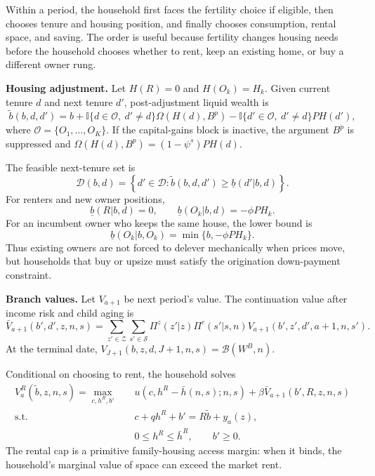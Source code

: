 \documentclass[11pt]{article}
\newcommand{\ind}{\mathbb{I}}
\newcommand{\Dset}{\mathcal D}
\newcommand{\Zset}{\mathcal Z}
\newcommand{\Sset}{\mathcal S}
\newcommand{\Oset}{\mathcal O}
\newcommand{\Bcal}{\mathcal B}
\begin{document}
Within a period, the household first faces the fertility choice if eligible,
then chooses tenure and housing position, and finally chooses consumption,
rental space, and saving. The order is useful because fertility changes
housing needs before the household chooses whether to rent, keep an existing
home, or buy a different owner rung.

\textbf{Housing adjustment.}
Let $H(R)=0$ and $H(O_k)=H_k$. Given current tenure $d$ and next tenure $d'$,
post-adjustment liquid wealth is
\begin{equation}
\widetilde b(b,d,d')
=
b
+\ind\{d\in\Oset,\ d'\neq d\}\Omega(H(d),B^p)
-\ind\{d'\in\Oset,\ d'\neq d\}PH(d'),
\label{eq:adjusted_wealth}
\end{equation}
where $\Oset=\{O_1,\ldots,O_K\}$. If the capital-gains block is inactive, the
argument $B^p$ is suppressed and $\Omega(H(d),B^p)=(1-\psi^s)PH(d)$.

The feasible next-tenure set is
\begin{equation}
\Dset(b,d)
=
\left\{
d'\in\Dset:
\widetilde b(b,d,d')\geq \underline b(d'|b,d)
\right\}.
\label{eq:feasible_tenure}
\end{equation}
For renters and new owner positions,
\begin{equation*}
\underline b(R|b,d)=0,
\qquad
\underline b(O_k|b,d)=-\phi PH_k.
\end{equation*}
For an incumbent owner who keeps the same house, the lower bound is
\begin{equation}
    \underline b(O_k|b,O_k)=\min\{b,-\phi PH_k\}.
    \label{eq:incumbent_ltv}
\end{equation}
Thus existing owners are not forced to delever mechanically when prices move,
but households that buy or upsize must satisfy the origination down-payment
constraint.

\textbf{Branch values.}
Let $V_{a+1}$ be next period's value. The continuation value after income risk
and child aging is
\begin{equation}
\bar V_{a+1}(b',d',z,n,s)
=
\sum_{z'\in\Zset}\sum_{s'\in\Sset}
\Pi^z(z'|z)\Pi^c(s'|s,n)
V_{a+1}(b',z',d',a+1,n,s').
\label{eq:continuation}
\end{equation}
At the terminal date, $V_{J+1}(b,z,d,J+1,n,s)=\Bcal(W^B,n)$.

Conditional on choosing to rent, the household solves
\begin{equation}
\begin{aligned}
V^R_a(\widetilde b,z,n,s)
=
\max_{c,h^R,b'}\quad
&u(c,h^R-\bar h(n,s);n,s)
+\beta \bar V_{a+1}(b',R,z,n,s)\\
\text{s.t.}\quad
&c+q h^R+b'=R\widetilde b+y_a(z),\\
&0\leq h^R\leq \bar h^R,\qquad b'\geq 0.
\end{aligned}
\label{eq:renter_problem}
\end{equation}
The rental cap is a primitive family-housing access margin: when it binds, the
household's marginal value of space can exceed the market rent.
\end{document}
